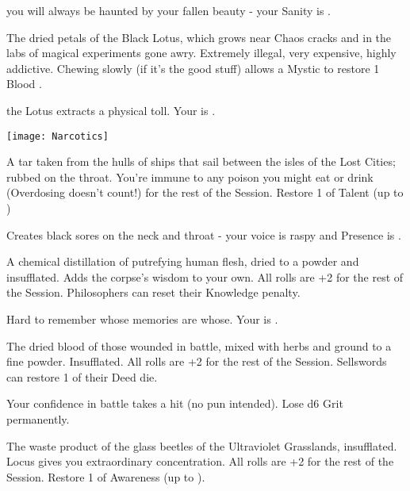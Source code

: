 {\begin{multicols}{2}
    you will always be haunted by your fallen beauty - your \MAX Sanity is \DCDOWN.


  The dried petals of the Black Lotus, which grows near Chaos cracks and in the labs of magical experiments gone awry. Extremely illegal, very expensive, highly addictive.  Chewing slowly (if it's the good stuff) allows a Mystic to restore 1 Blood \POOL.

    the Lotus extracts a physical toll.  Your \MAX \VIG is \DCDOWN.


  \begin{center}
  \texttt{[image: Narcotics]}
  \end{center}



  A tar taken from the hulls of ships that sail between the isles of the Lost Cities; rubbed on the throat. You're immune to any poison you might eat or drink (Overdosing doesn't count!) for the rest of the Session. Restore 1 \UD of Talent (up to \MAX)

     Creates black sores on the neck and throat - your voice is raspy and \MAX Presence is \DCDOWN.



  A chemical distillation of putrefying human flesh, dried to a powder and insufflated. Adds the corpse's wisdom to your own.  All \INT rolls are +2 for the rest of the Session. Philosophers can reset their Knowledge penalty.

     Hard to remember whose memories are whose.  Your \MAX \FOC is \DCDOWN.


    The dried blood of those wounded in battle, mixed with herbs and ground to a fine powder.  Insufflated.  All \VIG rolls are +2 for the rest of the Session. Sellswords can restore 1 \UD of their Deed die.

     Your confidence in battle takes a hit (no pun intended).  Lose d6 Grit permanently.



  The waste product of the glass beetles of the Ultraviolet Grasslands, insufflated.  Locus gives you extraordinary concentration.  All \FOC rolls are +2 for the rest of the Session.  Restore 1 \UD of Awareness (up to \MAX).


\end{multicols}}

